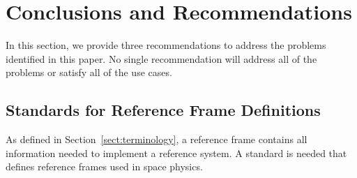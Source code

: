 \documentclass[draft]{agujournal2019}
\begin{document}







\section{Conclusions and Recommendations}
\label{sect:conclusions}


In this section, we provide three recommendations to address the problems identified in this paper. No single recommendation will address all of the problems or satisfy all of the use cases.

\subsection{Standards for Reference Frame Definitions}

As defined in Section~\ref{sect:terminology}, a reference frame contains all information needed to implement a reference system. A standard is needed that defines reference frames used in space physics.
\end{document}

